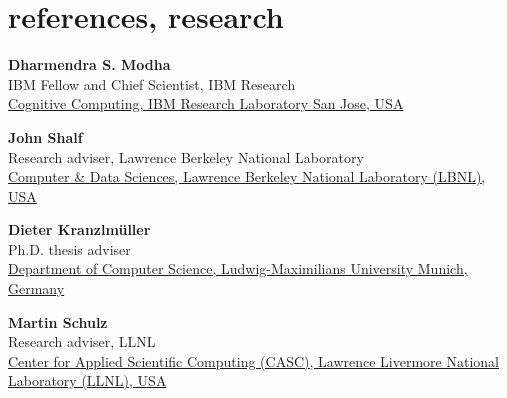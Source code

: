 \documentclass[]{friggeri-cv} %
\begin{document}

\section{references, research}

{\color{orange}{\large{$\star$}}} \textbf{Dharmendra S. Modha} \\
{IBM Fellow and Chief Scientist, IBM Research} \\
{\href{http://researcher.watson.ibm.com/researcher/view.php?person=us-dmodha}{Cognitive Computing, IBM Research Laboratory San Jose, USA}}{}{}


{\color{orange}{\large{$\star$}}} \textbf{John Shalf} \\
{Research adviser, Lawrence Berkeley National Laboratory} \\
{\href{http://crd.lbl.gov/about/staff/cds/john-shalf/}{Computer \& Data Sciences, Lawrence Berkeley National Laboratory (LBNL), USA}}{}{}


{\color{orange}{\large{$\star$}}} \textbf{Dieter Kranzlm{\"u}ller} \\
{Ph.D. thesis adviser} \\
{\href{http://www.nm.ifi.lmu.de/~kranzlm}{Department of Computer Science, Ludwig-Maximilians University Munich, Germany}}{}{}


{\color{orange}{\large{$\star$}}} \textbf{Martin Schulz} \\
{Research adviser, LLNL} \\ 
{\href{http://people.llnl.gov/schulz6}{Center for Applied Scientific Computing (CASC), Lawrence Livermore National Laboratory (LLNL), USA}}{}{}
{}
\end{document}
